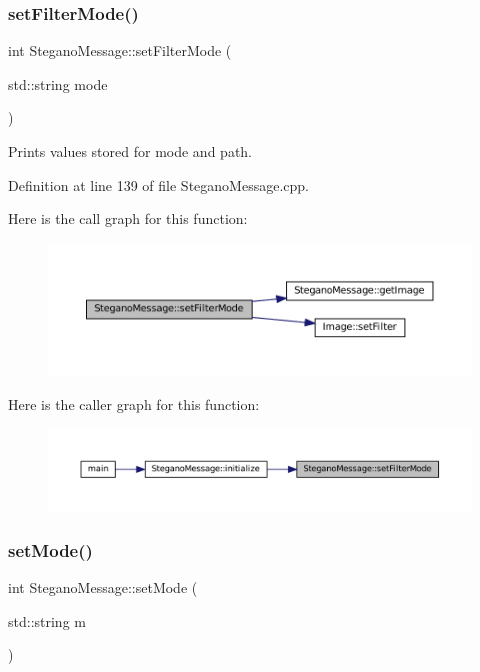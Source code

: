 \subsubsection{\texorpdfstring{setFilterMode()}{setFilterMode()}}
{\footnotesize\ttfamily int Stegano\+Message\+::set\+Filter\+Mode (\begin{DoxyParamCaption}\item[{std\+::string}]{mode }\end{DoxyParamCaption})}



Prints values stored for mode and path. 



Definition at line 139 of file Stegano\+Message.\+cpp.

Here is the call graph for this function\+:\nopagebreak
\begin{figure}[H]
\begin{center}
\leavevmode
\includegraphics[width=350pt]{classSteganoMessage_a5c3ef910b17f4bbe32a73a33be9d7586_cgraph}
\end{center}
\end{figure}
Here is the caller graph for this function\+:\nopagebreak
\begin{figure}[H]
\begin{center}
\leavevmode
\includegraphics[width=350pt]{classSteganoMessage_a5c3ef910b17f4bbe32a73a33be9d7586_icgraph}
\end{center}
\end{figure}
\mbox{\label{classSteganoMessage_a3e06a73baa5744b5eb9152f4ae65f458}} 
\subsubsection{\texorpdfstring{setMode()}{setMode()}}
{\footnotesize\ttfamily int Stegano\+Message\+::set\+Mode (\begin{DoxyParamCaption}\item[{std\+::string}]{m }\end{DoxyParamCaption})}



